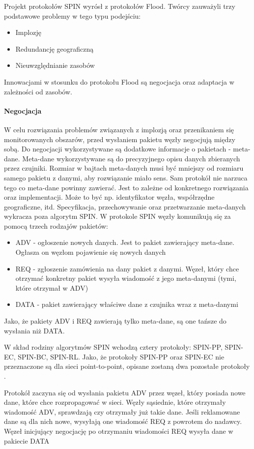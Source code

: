 Projekt protokołów SPIN wyrósł z protokołów Flood. Twórcy zauważyli trzy podstawowe problemy w tego typu podejściu:
\begin{itemize}
	\item Implozję
	\item Redundancję geograficzną
	\item Nieuwzględnianie zasobów
\end{itemize}

Innowacjami w stosunku do protokołu Flood są negocjacja oraz adaptacja w zależności od zasobów.

\paragraph{Negocjacja} W celu rozwiązania problemów związanych z implozją oraz przenikaniem się monitorowanych obszarów, przed wysłaniem pakietu węzły negocjują między sobą. Do negocjacji wykorzystywane są dodatkowe informacje o pakietach - meta-dane. 
Meta-dane wykorzystywane są do precyzyjnego opisu danych zbieranych przez czujniki. Rozmiar w bajtach meta-danych musi być mniejszy od rozmiaru samego pakietu z danymi, aby rozwiązanie miało sens.
Sam protokół nie narzuca tego co meta-dane powinny zawierać. Jest to zależne od konkretnego rozwiązania oraz implementacji. Może to być np. identyfikator węzła, współrzędne geograficzne, itd. Specyfikacja, przechowywanie oraz przetwarzanie meta-danych wykracza poza algorytm SPIN.
W protokole SPIN węzły komunikują się za pomocą trzech rodzajów pakietów:
\begin{itemize}
	\item ADV - ogłoszenie nowych danych. Jest to pakiet zawierający meta-dane. Ogłasza on węzłom pojawienie się nowych danych
	\item REQ - zgłoszenie zamówienia na dany pakiet z danymi. Węzeł, który chce otrzymać konkretny pakiet wysyła wiadomość z jego meta-danymi (tymi, które otrzymał w ADV)
	\item DATA - pakiet zawierający właściwe dane z czujnika wraz z meta-danymi
\end{itemize}
Jako, że pakiety ADV i REQ zawierają tylko meta-dane, są one tańsze do wysłania niż DATA.

W skład rodziny algorytmów SPIN wchodzą cztery protokoły: SPIN-PP, SPIN-EC, SPIN-BC, SPIN-RL. Jako, że protokoły SPIN-PP oraz SPIN-EC nie przeznaczone są dla sieci point-to-point, opisane zostaną dwa pozostałe protokoły \cite{Dargie2010, Kulik2002}.

Protokół zaczyna się od wysłania pakietu ADV przez węzeł, który posiada nowe dane, które chce rozpropagować w sieci. Węzły sąsiednie, które otrzymały wiadomość ADV, sprawdzają czy otrzymały już takie dane. Jeśli reklamowane dane są dla nich nowe, wysyłają one wiadomość REQ z powrotem do nadawcy. Węzeł inicjujący negocjację po otrzymaniu wiadomości REQ wysyła dane w pakiecie DATA

